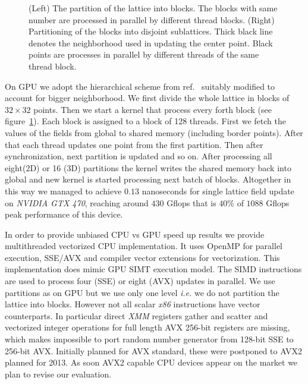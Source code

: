 \documentclass[a4paper]{llncs}
\def\neighborhood{--
  ++(0,-0.5)-- ++(1,0)-- ++(0,-0.5)-- ++(0,-0.5)-- ++(1,0)--
  ++(0,-1.0)-- ++(1,0)-- ++(0,1.0)-- ++(1,0)-- ++(0,1.0)-- ++(1,0)--
  ++(0,1)-- ++(-1,0)-- ++(0,1)-- ++(-1,0)-- ++(0,1)-- ++(-1,0)-- ++(0,-1)--
  ++(-1,0)-- ++(0,-1)-- ++(-1,0)-- ++(0,-0.6)}
\begin{document}
\begin{figure}
\begin{center}
\end{center}
\caption{\label{fig:nn} (Left) The partition of the lattice into
  blocks. The blocks with same number are processed in parallel by
  different thread blocks.  (Right) Partitioning of the blocks into
  disjoint sublattices.  Thick black line denotes the neighborhood  used in updating the center point. Black points are processes in parallel by
  different threads of the same thread block.}
\end{figure}


On GPU we adopt the hierarchical scheme from ref.~\cite{weigel}
suitably modified to account for bigger neighborhood.  We first divide
the whole lattice in blocks of $32\times 32$ points. Then we start a
kernel that process every forth block (see figure~\ref{fig:nn}).  Each
block is assigned to a block of 128 threads. First we fetch the values of the fields from global to shared memory (including border points).  
After that each thread updates
one point from the first partition. Then after synchronization, next
partition is updated and so on. After processing all eight(2D) or 16
(3D) partitions the kernel writes the shared memory back into global
and new kernel is started processing next batch of blocks. 
Altogether in this
way we managed to achieve $0.13$ nanoseconds for single lattice field
update on \emph{NVIDIA GTX 470}, reaching around $430$ Gflops that is
$40\%$ of $1088$ Gflops peak performance of this device.

In order to provide unbiased CPU vs GPU speed up results we provide
multithreaded vectorized CPU implementation. It uses OpenMP for
parallel execution,  SSE/AVX and compiler vector extensions for
vectorization.  This implementation does mimic GPU SIMT execution
model.  The SIMD instructions are used to process four (SSE) or eight
(AVX) updates in parallel. We use partitions as on GPU but we use only
one level {\em i.e.} we do not partition the lattice into blocks.
However not all scalar \emph{x86} instructions have vector
counterparts.  In particular direct \emph{XMM} registers gather and
scatter and vectorized integer operations for full length AVX 256-bit
registers are missing, which makes impossible to port random number
generator from 128-bit SSE to 256-bit AVX. Initially planned for AVX
standard, these were postponed to AVX2 planned for 2013. As soon AVX2
capable CPU devices appear on the market we plan to revise our
evaluation.
\end{document}
